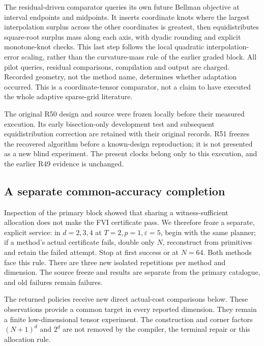 The residual-driven comparator queries its own future Bellman objective at interval endpoints and midpoints. It inserts coordinate knots where the largest interpolation surplus across the other coordinates is greatest, then equidistributes square-root surplus mass along each axis, with dyadic rounding and explicit monotone-knot checks. This last step follows the local quadratic interpolation-error scaling, rather than the curvature-mass rule of the earlier graded block. All pilot queries, residual comparisons, compilation and output are charged. Recorded geometry, not the method name, determines whether adaptation occurred. This is a coordinate-tensor comparator, not a claim to have executed the whole adaptive sparse-grid literature.

The original R50 design and source were frozen locally before their measured execution. Its early bisection-only development test and subsequent equidistribution correction are retained with their original records. R51 freezes the recovered algorithm before a known-design reproduction; it is not presented as a new blind experiment. The present clocks belong only to this execution, and the earlier R49 evidence is unchanged.




\subsection{A separate common-accuracy completion}
Inspection of the primary block showed that sharing a witness-sufficient allocation does not make the FVI certificate pass. We therefore froze a separate, explicit service: in $d=2,3,4$ at $T=2,p=1,\varepsilon=5$, begin with the same planner; if a method's actual certificate fails, double only $N$, reconstruct from primitives and retain the failed attempt. Stop at first success or at $N=64$. Both methods face this rule. There are three new isolated repetitions per method and dimension. The source freeze and results are separate from the primary catalogue, and old failures remain failures.


The returned policies receive new direct actual-cost comparisons below. These observations provide a common target in every reported dimension. They remain a finite low-dimensional tensor experiment. The construction and corner factors $(N+1)^d$ and $2^d$ are not removed by the compiler, the terminal repair or this allocation rule.

